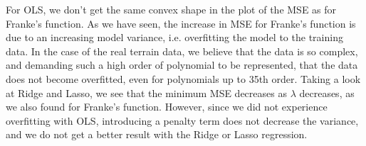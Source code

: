 For OLS, we don't get the same convex shape in the plot of the MSE as for Franke's function. As we have seen, the increase in MSE for Franke's function is due to an increasing model variance, i.e. overfitting the model to the training data. In the case of the real terrain data, we believe that the data is so complex, and demanding such a high order of polynomial to be represented, that the data does not become overfitted, even for polynomials up to 35th order. Taking a look at Ridge and Lasso, we see that the minimum MSE decreases as $\lambda$ decreases, as we also found for Franke's function. However, since we did not experience overfitting with OLS, introducing a penalty term does not decrease the variance, and we do not get a better result with the Ridge or Lasso regression. 
